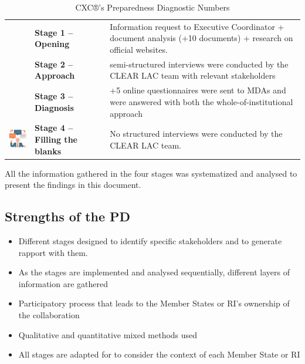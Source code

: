 \documentclass[
  10pt,
]{book}
\begin{document}
\begin{longtable}[]{@{}
  >{\raggedright\arraybackslash}p{}
  >{\centering\arraybackslash}p{}
  >{\raggedleft\arraybackslash}p{}@{}}
\caption{\label{tab:table1} CXC®'s Preparedness Diagnostic Numbers}\tabularnewline
\toprule
\endhead
& \textbf{Stage 1 -- Opening} & Information request to Executive Coordinator + document analysis (+10 documents) + research on official websites. \\
& \textbf{Stage 2 -- Approach} & 4 semi-structured interviews were conducted by the CLEAR LAC team with relevant stakeholders \\
& \textbf{Stage 3 -- Diagnosis} & +5 online questionnaires were sent to MDAs and were answered with both the whole-of-institutional approach \\
\includegraphics{./images/tb1_4.png} & \textbf{Stage 4 -- Filling the blanks} & No structured interviews were conducted by the CLEAR LAC team. \\
\bottomrule
\end{longtable}

All the information gathered in the four stages was systematized and analysed to present the findings in this document.

\hypertarget{strengths-of-the-pd}{%
\subsection*{Strengths of the PD}\label{strengths-of-the-pd}}

\begin{itemize}
\item
  Different stages designed to identify specific stakeholders and to generate rapport with them.
\item
  As the stages are implemented and analysed sequentially, different layers of information are gathered
\item
  Participatory process that leads to the Member States or RI's ownership of the collaboration
\item
  Qualitative and quantitative mixed methods used
\item
  All stages are adapted for to consider the context of each Member State or RI
\end{itemize}
\end{document}
